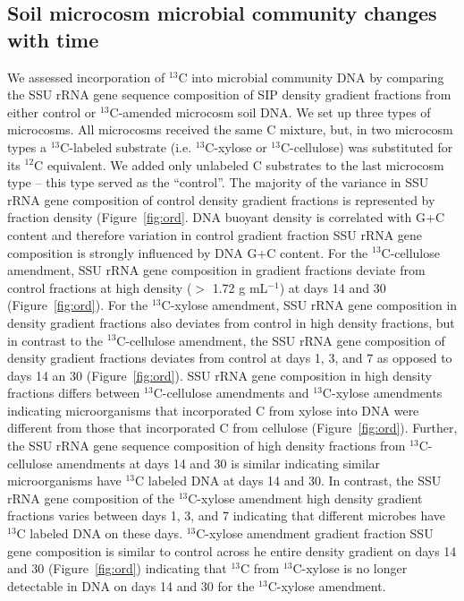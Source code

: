 \subsection{Soil microcosm microbial community changes with time}
We assessed incorporation of $^{13}$C into microbial community DNA by comparing the
SSU rRNA gene sequence composition of SIP density gradient fractions from
either control or $^{13}$C-amended microcosm soil DNA. We set up three types of
microcosms. All microcosms received the same C mixture, but, in two microcosm
types a $^{13}$C-labeled substrate (i.e. $^{13}$C-xylose or $^{13}$C-cellulose)
was substituted for its $^{12}$C equivalent. We added only unlabeled
C substrates to the last microcosm type -- this type served as the ``control''.
The majority of the variance in SSU rRNA gene composition of control density
gradient fractions is represented by fraction density (Figure~\ref{fig:ord}.
DNA buoyant density is correlated with G$+$C content \citep{Buckley_2007} and
therefore variation in control gradient fraction SSU rRNA gene composition is
strongly influenced by DNA G$+$C content. For the $^{13}$C-cellulose amendment,
SSU rRNA gene composition in gradient fractions deviate from control fractions
at high density ($>$ 1.72 g mL$^{-1}$) at days 14 and 30
(Figure~\ref{fig:ord}). For the $^{13}$C-xylose amendment, SSU rRNA gene
composition in density gradient fractions also deviates from control in high
density fractions, but in contrast to the $^{13}$C-cellulose amendment, the SSU
rRNA gene composition of density gradient fractions deviates from control at
days 1, 3, and 7 as opposed to days 14 an 30 (Figure~\ref{fig:ord}). SSU rRNA
gene composition in high density fractions differs between $^{13}$C-cellulose
amendments and $^{13}$C-xylose amendments indicating microorganisms that
incorporated C from xylose into DNA were different from those that
incorporated C from cellulose (Figure~\ref{fig:ord}). Further, the SSU
rRNA gene sequence composition of high density fractions from
$^{13}$C-cellulose amendments at days 14 and 30 is similar indicating similar
microorganisms have $^{13}$C labeled DNA at days 14 and 30. In contrast, the
SSU rRNA gene composition of the $^{13}$C-xylose amendment high density
gradient fractions varies between days 1, 3, and
7 indicating that different microbes have $^{13}$C labeled DNA on these days.
$^{13}$C-xylose amendment gradient fraction SSU gene composition is similar
to control across he entire density gradient on days 14 and 30
(Figure~\ref{fig:ord}) indicating that $^{13}$C from $^{13}$C-xylose is no
longer detectable in DNA on days 14 and 30 for the $^{13}$C-xylose amendment. 

